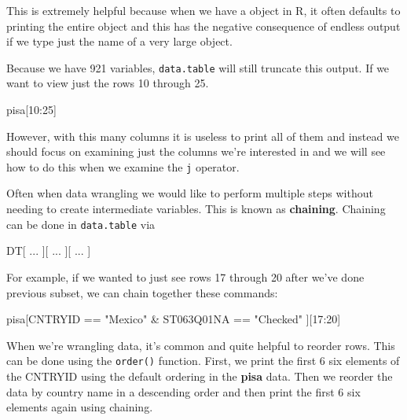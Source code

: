 \documentclass[
]{book}
\newenvironment{Shaded}{\begin{snugshade}}{\end{snugshade}}
\newcommand{\DecValTok}[1]{\textcolor[rgb]{0.00,0.00,0.81}{#1}}
\newcommand{\NormalTok}[1]{#1}
\newcommand{\SpecialCharTok}[1]{\textcolor[rgb]{0.00,0.00,0.00}{#1}}
\newcommand{\StringTok}[1]{\textcolor[rgb]{0.31,0.60,0.02}{#1}}
\begin{document}
This is extremely helpful because when we have a object in R, it often defaults to printing the entire object and this has the negative consequence of endless output if we type just the name of a very large object.

Because we have 921 variables, \texttt{data.table} will still truncate this output. If we want to view just the rows 10 through 25.

\begin{Shaded}
\begin{Highlighting}[]
\NormalTok{pisa[}\DecValTok{10}\SpecialCharTok{:}\DecValTok{25}\NormalTok{]}
\end{Highlighting}
\end{Shaded}

However, with this many columns it is useless to print all of them and instead we should focus on examining just the columns we're interested in and we will see how to do this when we examine the \texttt{j} operator.

Often when data wrangling we would like to perform multiple steps without needing to create intermediate variables. This is known as \textbf{chaining}. Chaining can be done in \texttt{data.table} via

\begin{Shaded}
\begin{Highlighting}[]
\NormalTok{DT[ ...}
\NormalTok{   ][ ...}
\NormalTok{     ][ ...}
\NormalTok{       ]}
\end{Highlighting}
\end{Shaded}

For example, if we wanted to just see rows 17 through 20 after we've done previous subset, we can chain together these commands:

\begin{Shaded}
\begin{Highlighting}[]
\NormalTok{pisa[CNTRYID }\SpecialCharTok{==} \StringTok{"Mexico"} \SpecialCharTok{\&}\NormalTok{ ST063Q01NA }\SpecialCharTok{==} \StringTok{"Checked"}
\NormalTok{     ][}\DecValTok{17}\SpecialCharTok{:}\DecValTok{20}\NormalTok{]}
\end{Highlighting}
\end{Shaded}

When we're wrangling data, it's common and quite helpful to reorder rows. This can be done using the \texttt{order()} function. First, we print the first 6 six elements of the CNTRYID using the default ordering in the \textbf{pisa} data. Then we reorder the data by country name in a descending order and then print the first 6 six elements again using chaining.
\end{document}
